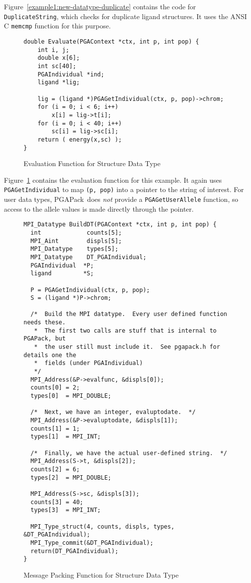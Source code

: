 \documentclass{report}
\newcommand{\pga}{PGAPack}
\begin{document}
Figure~\ref{example1:new-datatype-duplicate} contains the code for {\tt
DuplicateString}, which checks for duplicate ligand structures.  It uses the
ANSI C {\tt memcmp} function for this purpose.

\begin{figure}
\begin{verbatim}
double Evaluate(PGAContext *ctx, int p, int pop) {
    int i, j;
    double x[6];
    int sc[40];
    PGAIndividual *ind;
    ligand *lig;

    lig = (ligand *)PGAGetIndividual(ctx, p, pop)->chrom;
    for (i = 0; i < 6; i++)
        x[i] = lig->t[i];
    for (i = 0; i < 40; i++)
        sc[i] = lig->sc[i];
    return ( energy(x,sc) );
}
\end{verbatim}
\caption{Evaluation Function for Structure Data Type}
\label{example1:new-datatype-evaluate}
\end{figure}

Figure~\ref{example1:new-datatype-evaluate} contains the evaluation function
for this example.  It again uses {\tt PGAGetIndividual} to map {\tt (p, pop)}
into a pointer to the string of interest.  For user data types, \pga\ does
{\em not} provide a {\tt PGAGetUserAllele} function, so access to the allele
values is made directly through the pointer.

\begin{figure}
\begin{verbatim}
MPI_Datatype BuildDT(PGAContext *ctx, int p, int pop) {
  int             counts[5];
  MPI_Aint        displs[5];
  MPI_Datatype    types[5];
  MPI_Datatype    DT_PGAIndividual;
  PGAIndividual  *P;
  ligand         *S;

  P = PGAGetIndividual(ctx, p, pop);
  S = (ligand *)P->chrom;

  /*  Build the MPI datatype.  Every user defined function needs these.
   *  The first two calls are stuff that is internal to PGAPack, but 
   *  the user still must include it.  See pgapack.h for details one the
   *  fields (under PGAIndividual)
   */
  MPI_Address(&P->evalfunc, &displs[0]);
  counts[0] = 2;
  types[0]  = MPI_DOUBLE;

  /*  Next, we have an integer, evaluptodate.  */  
  MPI_Address(&P->evaluptodate, &displs[1]);
  counts[1] = 1;
  types[1]  = MPI_INT;

  /*  Finally, we have the actual user-defined string.  */
  MPI_Address(S->t, &displs[2]);
  counts[2] = 6;
  types[2]  = MPI_DOUBLE;

  MPI_Address(S->sc, &displs[3]);
  counts[3] = 40;
  types[3]  = MPI_INT;

  MPI_Type_struct(4, counts, displs, types, &DT_PGAIndividual);
  MPI_Type_commit(&DT_PGAIndividual);
  return(DT_PGAIndividual);
}
\end{verbatim}
\caption{Message Packing Function for Structure Data Type}
\label{example1:new-datatype-build}
\end{figure}
\end{document}
